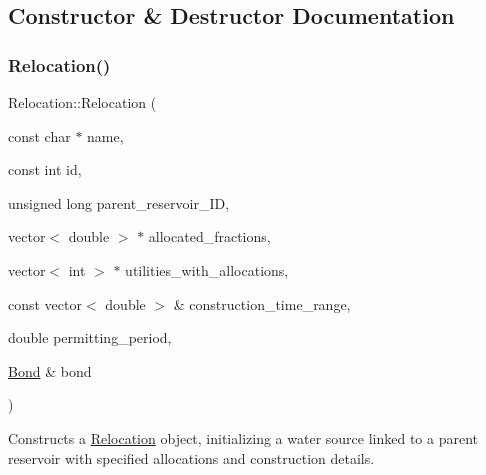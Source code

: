 \subsection{Constructor \& Destructor Documentation}
\mbox{\label{classRelocation_abeada1f0c797d8992c1e6a200b571574}} 
\subsubsection{\texorpdfstring{Relocation()}{Relocation()}\hspace{0.1cm}{\footnotesize\ttfamily [1/2]}}
{\footnotesize\ttfamily Relocation\+::\+Relocation (\begin{DoxyParamCaption}\item[{const char $\ast$}]{name,  }\item[{const int}]{id,  }\item[{unsigned long}]{parent\+\_\+reservoir\+\_\+\+ID,  }\item[{vector$<$ double $>$ $\ast$}]{allocated\+\_\+fractions,  }\item[{vector$<$ int $>$ $\ast$}]{utilities\+\_\+with\+\_\+allocations,  }\item[{const vector$<$ double $>$ \&}]{construction\+\_\+time\+\_\+range,  }\item[{double}]{permitting\+\_\+period,  }\item[{\mbox{\hyperlink{classBond}{Bond}} \&}]{bond }\end{DoxyParamCaption})}



Constructs a \mbox{\hyperlink{classRelocation}{Relocation}} object, initializing a water source linked to a parent reservoir with specified allocations and construction details. 


